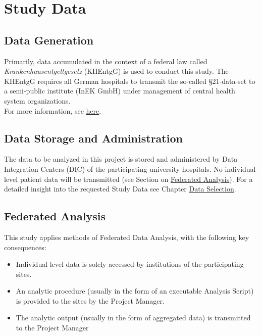 \documentclass[
  letterpaper,
  DIV=11,
  numbers=noendperiod]{scrreprt}
\providecommand{\tightlist}{%
  \setlength{\itemsep}{0pt}\setlength{\parskip}{0pt}}\usepackage{longtable,booktabs,array}
\begin{document}
\hypertarget{study-data-1}{%
\chapter{Study Data}\label{study-data-1}}

\hfill\break

\hypertarget{data-generation}{%
\section{Data Generation}\label{data-generation}}

Primarily, data accumulated in the context of a federal law called
\emph{Krankenhausentgeltgesetz} (KHEntgG) is used to conduct this study.
The KHEntgG requires all German hospitals to transmit the so-called
§21-data-set to a semi-public institute (InEK GmbH) under management of
central health system organizations.\\
For more information, see
\href{https://www.g-drg.de/datenlieferung-gem.-21-khentgg/datenlieferung-gem.-21-abs.1-khentgg/dokumente-zur-datenlieferung/dokumente-zur-datenlieferung}{here}.

\hypertarget{data-storage-and-administration}{%
\section{Data Storage and
Administration}\label{data-storage-and-administration}}

The data to be analyzed in this project is stored and administered by
Data Integration Centers (DIC) of the participating university
hospitals. No individual-level patient data will be transmitted (see
Section on \protect\hyperlink{section-FederatedAnalysis}{Federated
Analysis}). For a detailed insight into the requested Study Data see
Chapter \protect\hyperlink{chapter-DataSelection}{Data Selection}.

\hypertarget{section-FederatedAnalysis}{%
\section{Federated Analysis}\label{section-FederatedAnalysis}}

This study applies methods of Federated Data Analysis, with the
following key consequences:

\begin{itemize}
\tightlist
\item
  Individual-level data is solely accessed by institutions of the
  participating sites.
\item
  An analytic procedure (usually in the form of an executable Analysis
  Script) is provided to the sites by the Project Manager.
\item
  The analytic output (usually in the form of aggregated data) is
  transmitted to the Project Manager
\end{itemize}
\end{document}
